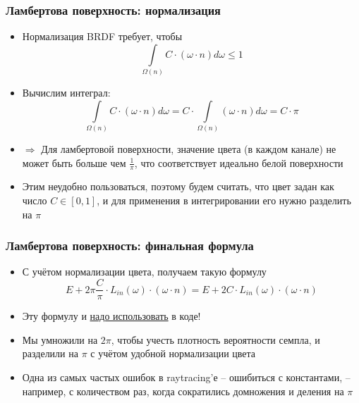 \documentclass[handout,10pt]{beamer}
\begin{document}
\begin{frame}[fragile]
\frametitle{Ламбертова поверхность: нормализация}
\begin{itemize}
\item Нормализация BRDF требует, чтобы \begin{equation*}\int\limits_{\Omega(n)} C\cdot (\omega\cdot n) d\omega \leq 1\end{equation*}
\pause
\item Вычислим интеграл:
\begin{equation*}\int\limits_{\Omega(n)} C\cdot (\omega\cdot n) d\omega = C\cdot\int\limits_{\Omega(n)} (\omega\cdot n) d\omega = C\cdot \pi\end{equation*}
\pause
\item \begin{math}\Longrightarrow\end{math} Для ламбертовой поверхности, значение цвета (в каждом канале) не может быть больше чем \begin{math}\frac{1}{\pi}\end{math}, что соответствует идеально белой поверхности
\pause
\item Этим неудобно пользоваться, поэтому будем считать, что цвет задан как число \begin{math}C \in [0, 1]\end{math}, и для применения в интегрировании его нужно разделить на \begin{math}\pi\end{math}
\end{itemize}
\end{frame}

\begin{frame}[fragile]
\frametitle{Ламбертова поверхность: финальная формула}
\begin{itemize}
\item С учётом нормализации цвета, получаем такую формулу
\begin{equation*}
E + 2\pi \frac{C}{\pi} \cdot L_{in}(\omega) \cdot (\omega \cdot n) = E + 2 C \cdot L_{in}(\omega) \cdot (\omega \cdot n)
\end{equation*}
\pause
\item Эту формулу и \underline{надо использовать} в коде!
\pause
\item Мы умножили на \begin{math}2\pi\end{math}, чтобы учесть плотность вероятности семпла, и разделили на \begin{math}\pi\end{math} с учётом удобной нормализации цвета
\pause
\item Одна из самых частых ошибок в raytracing'е -- ошибиться с константами, -- например, с количеством раз, когда сократились домножения и деления на \begin{math}\pi\end{math}
\end{itemize}
\end{frame}
\end{document}
